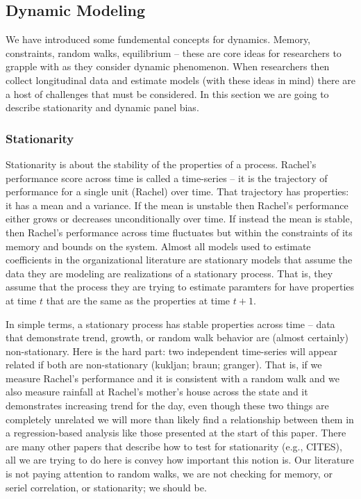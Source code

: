 \documentclass[english,,man]{apa6}
\theoremstyle{definition}
\theoremstyle{definition}
\theoremstyle{definition}
\theoremstyle{remark}
\begin{document}
\hypertarget{dynamic-modeling}{%
\subsection{Dynamic Modeling}\label{dynamic-modeling}}

We have introduced some fundemental concepts for dynamics. Memory,
constraints, random walks, equilibrium -- these are core ideas for
researchers to grapple with as they consider dynamic phenomenon. When
researchers then collect longitudinal data and estimate models (with
these ideas in mind) there are a host of challenges that must be
considered. In this section we are going to describe stationarity and
dynamic panel bias.

\hypertarget{stationarity}{%
\subsubsection{Stationarity}\label{stationarity}}

Stationarity is about the stability of the properties of a process.
Rachel's performance score across time is called a time-series -- it is
the trajectory of performance for a single unit (Rachel) over time. That
trajectory has properties: it has a mean and a variance. If the mean is
unstable then Rachel's performance either grows or decreases
unconditionally over time. If instead the mean is stable, then Rachel's
performance across time fluctuates but within the constraints of its
memory and bounds on the system. Almost all models used to estimate
coefficients in the organizational literature are stationary models that
assume the data they are modeling are realizations of a stationary
process. That is, they assume that the process they are trying to
estimate paramters for have properties at time \(t\) that are the same
as the properties at time \(t + 1\).

In simple terms, a stationary process has stable properties across time
-- data that demonstrate trend, growth, or random walk behavior are
(almost certainly) non-stationary. Here is the hard part: two
independent time-series will appear related if both are non-stationary
(kukljan; braun; granger). That is, if we measure Rachel's performance
and it is consistent with a random walk and we also measure rainfall at
Rachel's mother's house across the state and it demonstrates increasing
trend for the day, even though these two things are completely unrelated
we will more than likely find a relationship between them in a
regression-based analysis like those presented at the start of this
paper. There are many other papers that describe how to test for
stationarity (e.g., CITES), all we are trying to do here is convey how
important this notion is. Our literature is not paying attention to
random walks, we are not checking for memory, or seriel correlation, or
stationarity; we should be.
\end{document}
